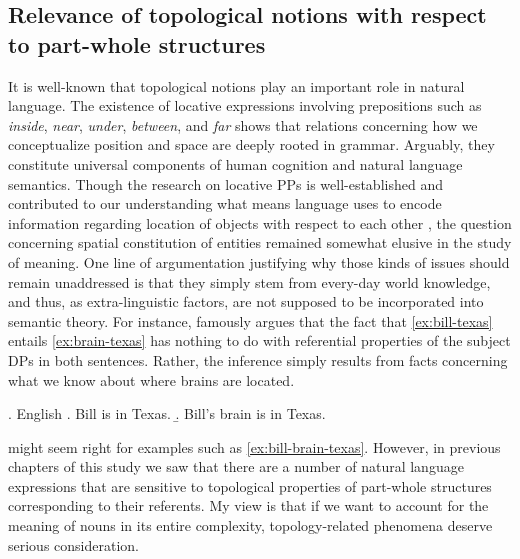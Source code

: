 \subsection{Relevance of topological notions with respect to part-whole structures}\label{sec:relevance-of-topological-notions-with-respect-to-part-whole-structures}

It is well-known that topological notions play an important role in natural language. The existence of locative expressions involving prepositions such as \textit{inside}, \textit{near}, \textit{under}, \textit{between}, and \textit{far} shows that relations concerning how we conceptualize position and space are deeply rooted in grammar. Arguably, they constitute universal components of human cognition and natural language semantics. Though the research on locative PPs is well-established and contributed to our understanding what means language uses to encode information regarding location of objects with respect to each other \citep[e.g.,][]{clark1973space,herskovits1985semantics,zwarts_winter1997semantic,kracht2002semantics}, the question concerning spatial constitution of entities remained somewhat elusive in the study of meaning. One line of argumentation justifying why those kinds of issues should remain unaddressed is that they simply stem from every-day world knowledge, and thus, as extra-linguistic factors, are not supposed to be incorporated into semantic theory. For instance, \citet{schwarzschild1996pluralities} famously argues that the fact that \ref{ex:bill-texas} entails \ref{ex:brain-texas} has nothing to do with referential properties of the subject DPs in both sentences. Rather, the inference simply results from facts concerning what we know about where brains are located. 

\ex. English \citep[p. 187]{schwarzschild1996pluralities}\label{ex:bill-brain-texas}
\a. Bill is in Texas.\label{ex:bill-texas}
\b. Bill's brain is in Texas.\label{ex:brain-texas}

\citeauthor{schwarzschild1996pluralities} might seem right for examples such as \ref{ex:bill-brain-texas}. However, in previous chapters of this study we saw that there are a number of natural language expressions that are sensitive to topological properties of part-whole structures corresponding to their referents. My view is that if we want to account for the meaning of nouns in its entire complexity, topology-related phenomena deserve serious consideration.

